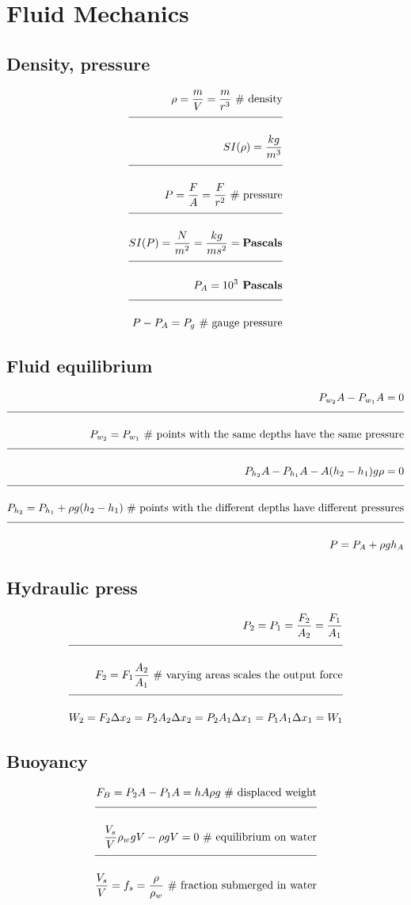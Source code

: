 \documentclass[a4paper]{article}
\newcommand{\eqComment}[1]{\text{  \# #1}}
\newcommand{\n}{\\[1.5ex] \hline \nonumber \\[0ex]}
\begin{document}
\section{Fluid Mechanics}
\subsection{Density, pressure}
\begin{tcolorbox}
\begin{align}
   \rho = \frac{m}{V} = \frac{m}{r^3} \eqComment{density}
\n SI(\rho) = \frac{kg}{m^3}
\n P = \frac{F}{A} = \frac{F}{r^2} \eqComment{pressure}
\n SI(P) = \frac{N}{m^2} = \frac{kg}{m s^2} = \textbf{Pascals}
\n P_A = 10^3 \textbf{ Pascals}
\n P - P_A = P_g \eqComment{gauge pressure}
\end{align}
\end{tcolorbox}

\subsection{Fluid equilibrium}
\begin{tcolorbox}
\begin{align}
   P_{w_2} A - P_{w_1} A = 0
\n P_{w_2} = P_{w_1} \eqComment{points with the same depths have the same pressure}
\n P_{h_2} A - P_{h_1} A - A (h_2 - h_1) g \rho = 0
\n P_{h_2} = P_{h_1} + \rho g (h_2 - h_1) \eqComment{points with the different depths have different pressures}
\n P = P_A + \rho g h_A
\end{align}
\end{tcolorbox}

\subsection{Hydraulic press}
\begin{tcolorbox}
\begin{align}
   P_2 = P_1 = \frac{F_2}{A_2} = \frac{F_1}{A_1}
\n F_2 = F_1 \frac{A_2}{A_1} \eqComment{varying areas scales the output force}
\n W_2 = F_2 \Delta x_2 = P_2 A_2 \Delta x_2 = P_2 A_1 \Delta x_1 = P_1 A_1 \Delta x_1 = W_1
\end{align}
\end{tcolorbox}

\subsection{Buoyancy}
\begin{tcolorbox}
\begin{align}
   F_B = P_2 A - P_1 A = h A \rho g \eqComment{displaced weight}
\n \frac{V_s}{V} \rho_w g V - \rho g V = 0 \eqComment{equilibrium on water}
\n \frac{V_s}{V} = f_s = \frac{\rho}{\rho_w} \eqComment{fraction submerged in water}
\end{align}
\end{tcolorbox}
\end{document}
